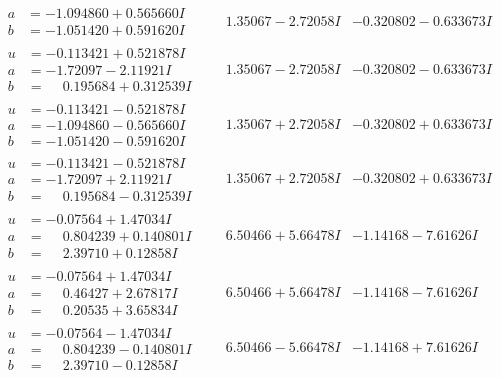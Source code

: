\documentclass[1p]{elsarticle_modified}
\theoremstyle{definition}
\begin{document}
$$\begin{array}{c|c|c}
\begin{aligned}
a &= -1.094860 + 0.565660 I \\
b &= -1.051420 + 0.591620 I\end{aligned}
 & \phantom{-}1.35067 - 2.72058 I & -0.320802 - 0.633673 I \\ \hline\begin{aligned}
u &= -0.113421 + 0.521878 I \\
a &= -1.72097 - 2.11921 I \\
b &= \phantom{-}0.195684 + 0.312539 I\end{aligned}
 & \phantom{-}1.35067 - 2.72058 I & -0.320802 - 0.633673 I \\ \hline\begin{aligned}
u &= -0.113421 - 0.521878 I \\
a &= -1.094860 - 0.565660 I \\
b &= -1.051420 - 0.591620 I\end{aligned}
 & \phantom{-}1.35067 + 2.72058 I & -0.320802 + 0.633673 I \\ \hline\begin{aligned}
u &= -0.113421 - 0.521878 I \\
a &= -1.72097 + 2.11921 I \\
b &= \phantom{-}0.195684 - 0.312539 I\end{aligned}
 & \phantom{-}1.35067 + 2.72058 I & -0.320802 + 0.633673 I \\ \hline\begin{aligned}
u &= -0.07564 + 1.47034 I \\
a &= \phantom{-}0.804239 + 0.140801 I \\
b &= \phantom{-}2.39710 + 0.12858 I\end{aligned}
 & \phantom{-}6.50466 + 5.66478 I & -1.14168 - 7.61626 I \\ \hline\begin{aligned}
u &= -0.07564 + 1.47034 I \\
a &= \phantom{-}0.46427 + 2.67817 I \\
b &= \phantom{-}0.20535 + 3.65834 I\end{aligned}
 & \phantom{-}6.50466 + 5.66478 I & -1.14168 - 7.61626 I \\ \hline\begin{aligned}
u &= -0.07564 - 1.47034 I \\
a &= \phantom{-}0.804239 - 0.140801 I \\
b &= \phantom{-}2.39710 - 0.12858 I\end{aligned}
 & \phantom{-}6.50466 - 5.66478 I & -1.14168 + 7.61626 I \\ \hline\begin{aligned}

\end{aligned}
\end{array}$$
\end{document}
